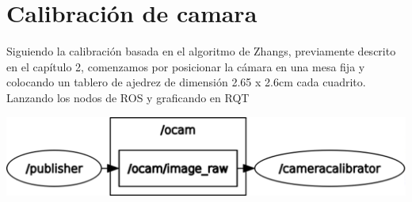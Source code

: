 
\section{Calibración de camara}
Siguiendo la calibración basada en el algoritmo de Zhangs, previamente descrito en el capítulo 2,
comenzamos por posicionar la cámara en una mesa fija y colocando un tablero de ajedrez de dimensión
2.65 x 2.6cm cada cuadrito.\\ Lanzando los nodos de ROS y graficando en RQT
\begin{center}
	\includegraphics[width=0.8 \textwidth]{Contenido/Cuerpo/Capitulo4/Fig11.eps}
	\label{Fig1}
\end{center}

